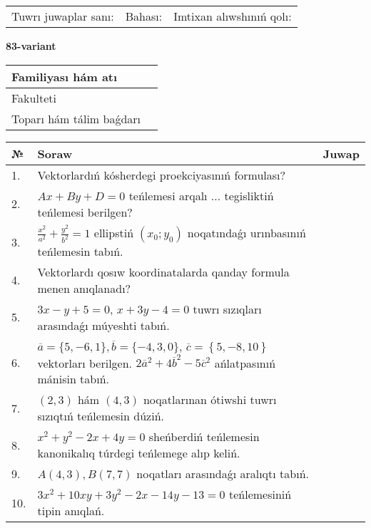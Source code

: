 \documentclass{article}
\begin{document}
\vspace{1cm}

\begin{tabular}{lll}
Tuwrı juwaplar sanı: \underline{\hspace{1.5cm}} & 
Bahası: \underline{\hspace{1.5cm}} & 
Imtixan alıwshınıń qolı: \underline{\hspace{2cm}} \\
\end{tabular}

\egroup

\newpage


\textbf{83-variant}\\

\bgroup
\def\arraystretch{1.6} %

\begin{tabular}{|m{5.7cm}|m{9.5cm}|}
\hline
Familiyası hám atı & \\
\hline
Fakulteti  & \\
\hline
Toparı hám tálim baǵdarı  & \\
\hline
\end{tabular}

\vspace{1cm}

\begin{tabular}{|m{0.7cm}|m{10cm}|m{4cm}|}
\hline
№ & Soraw & Juwap \\
\hline
1. & Vektorlardıń kósherdegi proekciyasınıń formulası? &  \\
\hline
2. & $Ax+By+D=0$ teńlemesi arqalı ... tegisliktiń teńlemesi berilgen? &  \\
\hline
3. & $\frac{x^2}{a^2}+\frac{y^2}{b^2}=1$ ellipstiń $(x_0;y_0)$ noqatındaǵı urınbasınıń teńlemesin tabıń. &  \\
\hline
4. & Vektorlardı qosıw koordinatalarda qanday formula menen anıqlanadı? &  \\
\hline
5. & $3x-y+5=0$, $x+3y-4=0$ tuwrı sızıqları arasındaǵı múyeshti tabıń. &  \\
\hline
6. & $\overline{a}=\{5,-6, 1 \}, \overline{b}=\{-4, 3, 0 \} $, $\overline{c}=\left\{ 5,-8, 10 \right\}$ vektorları berilgen. $2{\overline{a}}^{2}+4{\overline{b}}^{2}-5{\overline{c}}^{2}$ ańlatpasınıń mánisin tabıń. &  \\
\hline
7. & $(2, 3)$ hám $(4, 3)$ noqatlarınan ótiwshi tuwrı sızıqtıń teńlemesin dúziń. &  \\
\hline
8. & $x^{2}+y^{2}-2x+4y=0$ sheńberdiń teńlemesin kanonikalıq túrdegi teńlemege alıp keliń. &  \\
\hline
9. & $A(4, 3), B(7, 7)$ noqatları arasındaǵı aralıqtı tabıń. &  \\
\hline
10. & $3x^{2}+10xy+3y^{2}-2x-14y-13=0$ teńlemesiniń tipin anıqlań. &  \\
\hline
\end{tabular}
\end{document}
